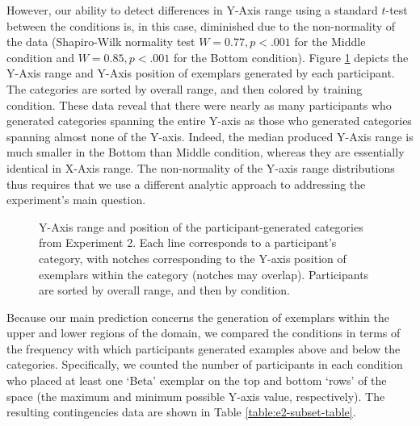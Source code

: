 \documentclass[12pt]{article}
\newcommand\inputpgf[2]{{
\let\pgfimageWithoutPath\pgfimage
\renewcommand{\pgfimage}[2][]{\pgfimageWithoutPath[##1]{#1/##2}}

}}
\begin{document}
\begin{flushleft}
However, our ability to detect differences in Y-Axis range using a standard
$t$-test between the conditions is, in this case, diminished due to the
non-normality of the data (Shapiro-Wilk normality test $W=0.77, p < .001$ for
the Middle condition and $W=0.85, p < .001$ for the Bottom condition). Figure \ref{fig:e2-yranges} depicts the Y-Axis range and Y-Axis position of exemplars generated by each participant. The categories are sorted by overall range, and then colored by training condition. These data reveal that there were nearly as many
participants who generated categories spanning the entire Y-axis as those who
generated categories spanning almost none of the Y-axis. Indeed, the median produced Y-Axis range is much smaller in the Bottom than Middle condition, whereas they are essentially identical in X-Axis range. The non-normality of the Y-axis range distributions thus requires that we use a different analytic approach to
addressing the experiment's main question.

\begin{figure}
    \begin{center} \inputpgf{figs/}{e2-yranges.pgf}
    \caption{Y-Axis range and position of the participant-generated categories
from Experiment 2. Each line corresponds to a participant's category, with
notches corresponding to the Y-axis position of exemplars within the category
(notches may overlap). Participants are sorted by overall range, and then by
condition. }
    \label{fig:e2-yranges}
    \end{center}
\end{figure}

Because our main prediction concerns the generation of exemplars within the
upper and lower regions of the domain, we compared the conditions in terms of
the frequency with which participants generated examples above and below the
categories. Specifically, we counted the number of participants in each
condition who placed at least one `Beta' exemplar on the top and bottom `rows'
of the space (the maximum and minimum possible Y-axis value, respectively). The
resulting contingencies data are shown in Table \ref{table:e2-subset-table}.


\end{flushleft}
\end{document}
